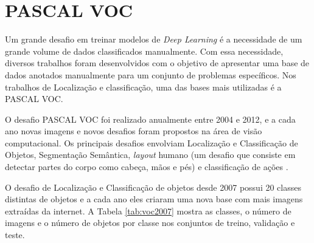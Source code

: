 \section{PASCAL VOC}
\label{secao:3:4}

Um grande desafio em treinar modelos de \textit{Deep Learning} é a necessidade de um grande volume de dados classificados manualmente. Com essa necessidade, diversos trabalhos foram desenvolvidos com o objetivo de apresentar uma base de dados anotados manualmente para um conjunto de problemas específicos. Nos trabalhos de Localização e classificação, uma das bases mais utilizadas é a \ac{PASCAL VOC}.

O desafio \ac{PASCAL VOC} foi realizado anualmente entre 2004 e 2012, e a cada ano novas imagens e novos desafios foram propostos na área de visão computacional. Os principais desafios envolviam Localização e Classificação de Objetos, Segmentação Semântica, \textit{layout} humano (um desafio que consiste em detectar partes do corpo como cabeça, mãos e pés) e classificação de ações \cite{everingham-2015}.

O desafio de Localização e Classificação de objetos desde 2007 possui 20 classes distintas de objetos e a cada ano eles criaram uma nova base com mais imagens extraídas da internet. A Tabela \ref{tab:voc2007} mostra as classes, o número de imagens e o número de objetos por classe nos conjuntos de treino, validação e teste.


